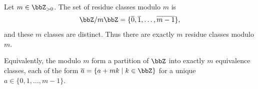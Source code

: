 \begin{lemma}
\label{lemma:number_of_residue_classes_modulo_m_is_m}
Let $m \in \bbZ_{> 0}$. The set of residue classes modulo $m$ is
$$ \bbZ / m\bbZ = \{ \overline{0}, \overline{1}, \dots, \overline{m-1} \}, $$
and these $m$ classes are distinct. Thus there are exactly $m$ residue classes modulo $m$.

Equivalently, the  modulo $m$ form a partition of $\bbZ$ into exactly $m$ equivalence classes, each of the form $\overline{a} = \{ a + mk \mid k \in \bbZ \}$ for a unique $a \in \{0, 1, \dots, m-1\}$.
\end{lemma}